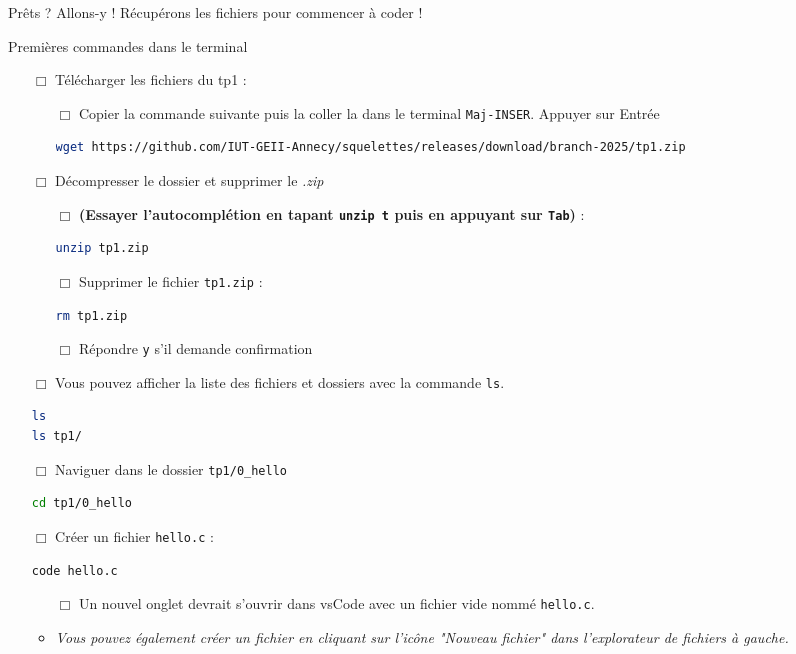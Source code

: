 Prêts ? Allons-y ! Récupérons les fichiers pour commencer à coder !

\begin{UPSTIManipulation}{Premières commandes dans le terminal}
	
	\begin{itemize}
		\item[$\Box$] Télécharger les fichiers du tp1 :
		      \begin{itemize}
			      \item[$\Box$] Copier la commande suivante puis la coller la dans le terminal \texttt{Maj-INSER}. Appuyer sur Entrée
			            \begin{lstlisting}[language=bash,style=console]
wget https://github.com/IUT-GEII-Annecy/squelettes/releases/download/branch-2025/tp1.zip
\end{lstlisting}
		      \end{itemize}
		\item[$\Box$] Décompresser le dossier et supprimer le \textit{.zip}
		      \begin{itemize}
			      \item[$\Box$] \textbf{(Essayer l'autocomplétion en tapant \texttt{unzip t} puis en appuyant sur \texttt{Tab})} :
			            \begin{lstlisting}[language=bash,style=console]
unzip tp1.zip
\end{lstlisting}
			      \item[$\Box$] Supprimer le fichier \texttt{tp1.zip} :
			            \begin{lstlisting}[language=bash,style=console]
rm tp1.zip
\end{lstlisting}
			      \item[$\Box$] Répondre \texttt{y} s'il demande confirmation
		      \end{itemize}
		\item[$\Box$] Vous pouvez afficher la liste des fichiers et dossiers avec la commande \texttt{ls}.
		      \begin{lstlisting}[language=bash,style=console]
ls
ls tp1/
\end{lstlisting}
		\item[$\Box$] Naviguer dans le dossier \texttt{tp1/0\_hello}
		      \begin{lstlisting}[language=bash,style=console]
cd tp1/0_hello
\end{lstlisting}
		\item[$\Box$] Créer un fichier \texttt{hello.c} :
		      \begin{lstlisting}[language=bash,style=console]
code hello.c
\end{lstlisting}
		      \begin{itemize}
			      \item[$\Box$] Un nouvel onglet devrait s'ouvrir dans vsCode avec un fichier vide nommé \texttt{hello.c}.
			      \item \textit{Vous pouvez également créer un fichier en cliquant sur l'icône "Nouveau fichier" dans l'explorateur de fichiers à gauche.}
		      \end{itemize}
	\end{itemize}
\end{UPSTIManipulation}